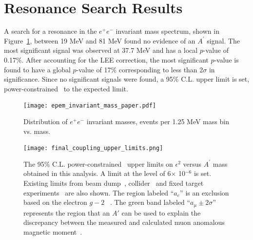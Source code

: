 \documentclass[twocolumn, showpacs, preprintnumbers,prd, superscriptaddress]{revtex4-1}
\newcommand{\pos}{e^{+}}
\newcommand{\ele}{e^{-}}
\newcommand{\epem}{\pos\ele}
\newcommand{\aprime}{A^\prime}
\begin{document}
    \section{Resonance Search Results}\label{sec:bhresults}
    
        A search for a resonance in the $\epem$ invariant mass spectrum, 
        shown in Figure~\ref{fig:mass}, between 19 MeV and 81 MeV found no 
        evidence of an $\aprime$ signal. The most significant signal was 
        observed at 37.7 MeV and has a local $p$-value of 0.17\%.  After 
        accounting for the LEE correction, the most significant $p$-value is 
        found to have a global $p$-value of 17\% corresponding to less than
        2$\sigma$ in significance. Since no significant signals were found, 
        a  95\% C.L. upper limit is set, power-constrained~\cite{Cowan:2011an}
        to the expected limit. 

        \begin{figure}[h]
            \centering
            \texttt{[image: epem\_invariant\_mass\_paper.pdf]}
            \caption{
                Distribution of $\epem$ invariant masses, events per 1.25 MeV 
                mass bin vs. mass.
            }
            \label{fig:mass}
        \end{figure}
        
        \begin{figure}[h]
            \centering
            \texttt{[image: final\_coupling\_upper\_limits.png]}
            \caption{
             The 95\% C.L. power-constrained~\cite{Cowan:2011an} upper limits on 
             $\epsilon^2$ versus $\aprime$ mass obtained in this analysis. A 
             limit at the level of 6$\times$ 10$^{-6}$ is set. Existing 
             limits from beam dump~\cite{Bjorken:1988as, riordan1987, bross1991, konaka1986,
             davier1989, Bjorken:2009mm, andreas2012, Blumlein:1990ay, Blumlein:1991xh}, 
             collider~\cite{Reece:2009un, Aubert:2009cp, Babusci:2012cr, Archilli:2011zc, Aaij:2017rft} 
             and fixed target experiments~\cite{Abrahamyan:2011gv, Merkel:2014avp,
            Agakishiev:2013fwl, Batley:2015lha} are also shown. 
             The region labeled ``$a_e$'' is an exclusion based 
             on the electron $g-2$~\cite{PhysRevLett.106.080801, Aoyama:2012wj, PhysRevLett.100.120801, Davoudiasl:2012ig}
             . The green band labeled ``$a_{\mu} \pm 2\sigma$''
             represents the region that an $A'$ can be used to explain the discrepancy 
             between the measured and calculated muon anomalous magnetic moment~\cite{Pospelov:2008zw, Bennett:2006fi}.
            }          
            \label{fig:epsilon_upper_limit}
        \end{figure}
\end{document}
